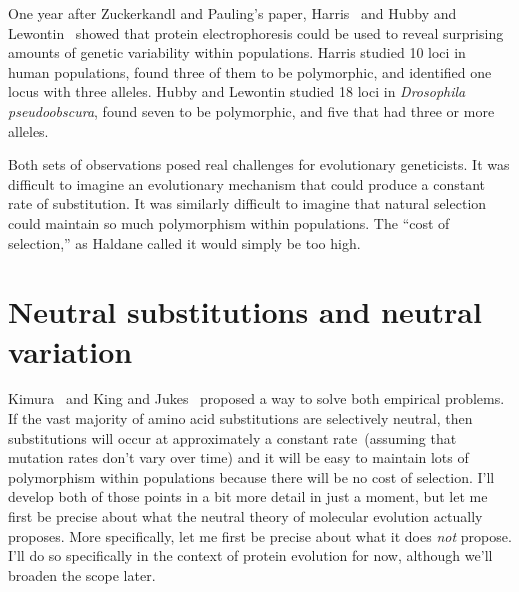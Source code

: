 One year after Zuckerkandl and Pauling's paper, Harris~\cite{Harris66}
and Hubby and Lewontin~\cite{Hubby-Lewontin66,Lewontin-Hubby66} showed
that protein electrophoresis could be used to reveal surprising
amounts of genetic variability within populations. Harris studied
10 loci in human populations, found three of them to be polymorphic,
and identified one locus with three alleles. Hubby and Lewontin
studied 18 loci in {\it Drosophila pseudoobscura\/}, found seven to be
polymorphic, and five that had three or more alleles.

Both sets of observations posed real challenges for evolutionary
geneticists. It was difficult to imagine an evolutionary mechanism
that could produce a constant rate of substitution. It was similarly
difficult to imagine that natural selection could maintain so much
polymorphism within populations. The ``cost of selection,'' as Haldane
called it would simply be too high.

\section*{Neutral substitutions and neutral variation}

Kimura~\cite{Kimura68} and King and Jukes~\cite{King-Jukes69} proposed
a way to solve both empirical problems. If the vast majority of amino
acid substitutions are selectively neutral, then substitutions will
occur at approximately a constant rate~(assuming that mutation rates
don't vary over time) and it will be easy to maintain lots of
polymorphism within populations because there will be no cost of
selection. I'll develop both of those points in a bit more detail in
just a moment, but let me first be precise about what the neutral
theory of molecular evolution actually proposes. More specifically,
let me first be precise about what it does {\it not\/} propose. I'll
do so specifically in the context of protein evolution for now,
although we'll broaden the scope later.

